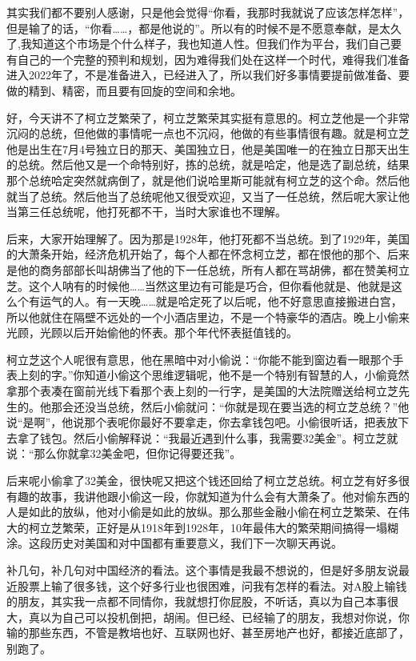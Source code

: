 \documentclass[UTF8, 12pt, a4paper]{ctexrep}
\begin{document}
其实我们都不要别人感谢，只是他会觉得“你看，我那时我就说了应该怎样怎样”，但是输了的话，“你看……，都是他说的”。所以有的时候不是不愿意奉献，是太久了,我知道这个市场是个什么样子，我也知道人性。但我们作为平台，我们自己要有自己的一个完整的预判和规划，因为难得我们处在这样一个时代，难得我们准备进入2022年了，不是准备进入，已经进入了，所以我们好多事情要提前做准备、要做的精到、精密，而且要有回旋的空间和余地。

好，今天讲不了柯立芝繁荣了，柯立芝繁荣其实挺有意思的。柯立芝他是一个非常沉闷的总统，但他做的事情呢一点也不沉闷，他做的有些事情很有趣。就是柯立芝他是出生在7月4号独立日的那天、美国独立日，他是美国唯一的在独立日那天出生的总统。然后他又是一个命特别好，拣的总统，就是哈定，他是选了副总统，结果那个总统哈定突然就病倒了，就是他们说哈里斯可能就有柯立芝的这个命。然后他就当了总统。然后他当了总统呢他又很受欢迎，又当了一任总统，然后呢大家让他当第三任总统呢，他打死都不干，当时大家谁也不理解。

后来，大家开始理解了。因为那是1928年，他打死都不当总统。到了1929年，美国的大萧条开始，经济危机开始了，每个人都在怀念柯立芝，都在恨他的那个、后来是他的商务部部长叫胡佛当了他的下一任总统，所有人都在骂胡佛，都在赞美柯立芝。这个人呐有的时候他……当然这里边有可能是巧合，但你看他就是、他就是这么个有运气的人。有一天晚……就是哈定死了以后呢，他不好意思直接搬进白宫，所以他就住在隔壁不远处的一个小酒店里边，不是一个特豪华的酒店。晚上小偷来光顾，光顾以后开始偷他的怀表。那个年代怀表挺值钱的。

柯立芝这个人呢很有意思，他在黑暗中对小偷说：“你能不能到窗边看一眼那个手表上刻的字。”你知道小偷这个思维逻辑呢，他不是一个特别有智慧的人，小偷竟然拿那个表凑在窗前光线下看那个表上刻的一行字，是美国的大法院赠送给柯立芝先生的。他那会还没当总统，然后小偷就问：“你就是现在要当选的柯立芝总统？”他说“是啊”，他说那个表呢你最好不要拿走，你去拿钱包吧。小偷很听话，把表放下去拿了钱包。然后小偷解释说：“我最近遇到什么事，我需要32美金”。柯立芝就说：“那么你就拿32美金吧，但你记得要还我”。

后来呢小偷拿了32美金，很快呢又把这个钱还回给了柯立芝总统。柯立芝有好多很有趣的故事，我讲他跟小偷这一段，你就知道为什么会有大萧条了。他对偷东西的人是如此的放纵，他对小偷是如此的放纵。那么那些金融小偷在柯立芝繁荣、在伟大的柯立芝繁荣，正好是从1918年到1928年，10年最伟大的繁荣期间搞得一塌糊涂。这段历史对美国和对中国都有重要意义，我们下一次聊天再说。

补几句，补几句对中国经济的看法。这个事情是我最不想说的，但是好多朋友说最近股票上输了很多钱，这个好多行业也很困难，问我有怎样的看法。对A股上输钱的朋友，其实我一点都不同情你，我就想打你屁股，不听话，真以为自己本事很大，真以为自己可以投机倒把，胡闹。但已经、已经输了的朋友，我想对你说，你输的那些东西，不管是教培也好、互联网也好、甚至房地产也好，都接近底部了，别跑了。
\end{document}
